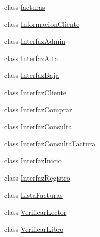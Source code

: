\begin{DoxyCompactItemize}
\item 
class \mbox{\hyperlink{class_interfaz_package_1_1facturas}{facturas}}
\item 
class \mbox{\hyperlink{class_interfaz_package_1_1_informacion_cliente}{Informacion\+Cliente}}
\item 
class \mbox{\hyperlink{class_interfaz_package_1_1_interfaz_admin}{Interfaz\+Admin}}
\item 
class \mbox{\hyperlink{class_interfaz_package_1_1_interfaz_alta}{Interfaz\+Alta}}
\item 
class \mbox{\hyperlink{class_interfaz_package_1_1_interfaz_baja}{Interfaz\+Baja}}
\item 
class \mbox{\hyperlink{class_interfaz_package_1_1_interfaz_cliente}{Interfaz\+Cliente}}
\item 
class \mbox{\hyperlink{class_interfaz_package_1_1_interfaz_comprar}{Interfaz\+Comprar}}
\item 
class \mbox{\hyperlink{class_interfaz_package_1_1_interfaz_consulta}{Interfaz\+Consulta}}
\item 
class \mbox{\hyperlink{class_interfaz_package_1_1_interfaz_consulta_factura}{Interfaz\+Consulta\+Factura}}
\item 
class \mbox{\hyperlink{class_interfaz_package_1_1_interfaz_inicio}{Interfaz\+Inicio}}
\item 
class \mbox{\hyperlink{class_interfaz_package_1_1_interfaz_registro}{Interfaz\+Registro}}
\item 
class \mbox{\hyperlink{class_interfaz_package_1_1_lista_facturas}{Lista\+Facturas}}
\item 
class \mbox{\hyperlink{class_interfaz_package_1_1_verificar_lector}{Verificar\+Lector}}
\item 
class \mbox{\hyperlink{class_interfaz_package_1_1_verificar_libro}{Verificar\+Libro}}
\end{DoxyCompactItemize}
